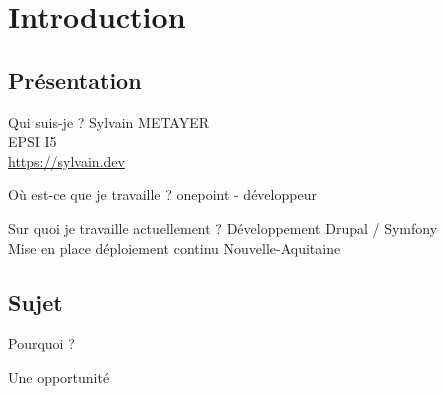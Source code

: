 \section{Introduction}

\subsection{Présentation}
\begin{frame}{\subsecname}
	\begin{block}{Qui suis-je ?}
	Sylvain METAYER \\ 
	EPSI I5 \\
	\url{https://sylvain.dev}
	\end{block}
	\pause
	\begin{block}{Où est-ce que je travaille ?}
	onepoint - développeur
	\end{block}
	\pause
	\begin{block}{Sur quoi je travaille actuellement ?}
	Développement Drupal / Symfony \\ 	
	Mise en place déploiement continu Nouvelle-Aquitaine
	\end{block}
\end{frame}

\subsection{Sujet}
\begin{frame}{\subsecname}
	 \begin{overprint}
			\begin{block}{Pourquoi ?}
			\end{block}
			\begin{block}{Une opportunité}
			\end{block}
	\end{overprint} 
\end{frame}
